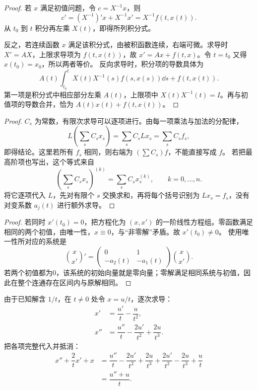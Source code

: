 \begin{proof}
若 $x$ 满足初值问题，令 $c=X^{-1}x$，则
\[
 c'=(X^{-1})'x+X^{-1}x'=X^{-1}f(t,x(t)).
\]
从 $t_0$ 到 $t$ 积分再左乘 $X(t)$，即得所列积分式。

反之，若连续函数 $x$ 满足该积分式，由被积函数连续，右端可微。求导时 $X'=AX$，上限求导项为 $f(t,x(t))$，故 $x'=Ax+f(t,x)$。令 $t=t_0$ 又得 $x(t_0)=x_0$，所以两者等价。
反向求导时，积分项的导数具体为
\[
A(t)\int_{t_0}^tX(t)X^{-1}(s)f(s,x(s))\dd s+f(t,x(t)).
\]
第一项是积分式中相应部分左乘 $A(t)$，上限项中 $X(t)X^{-1}(t)=I$。再与初值项的导数合并，恰为 $A(t)x(t)+f(t,x(t))$。
\end{proof}
\begin{proof}
$C_s$ 为常数，有限次求导可以逐项进行。由每一项乘法与加法的分配律，
\[
 L\left(\sum_s C_sx_s\right)=\sum_s C_sLx_s=\sum_s C_sf_s,
\]
即得结论。这里若所有 $f_s$ 相同，则右端为 $(\sum C_s)f$，不能直接写成 $f$。
若把最高阶项也写出，这个等式来自
\[
\left(\sum_sC_sx_s\right)^{(k)}=\sum_sC_sx_s^{(k)},\qquad k=0,\ldots,n.
\]
将它逐项代入 $L$，先对有限个 $s$ 交换求和，再将每个括号识别为 $Lx_s=f_s$，没有对变系数 $a_j(t)$ 进行额外求导。
\end{proof}
\begin{proof}
若同时 $x'(t_0)=0$，把方程化为 $(x,x')$ 的一阶线性方程组。零函数满足相同的两个初值，由唯一性，$x\equiv0$，与“非零解”矛盾。故 $x'(t_0)\ne0$。
使用唯一性所对应的系统是
\[
\binom{x}{x'}'=\begin{pmatrix}0&1\\-a_2(t)&-a_1(t)\end{pmatrix}\binom{x}{x'}.
\]
若两个初值都为0，该系统的初始向量就是零向量；零解满足相同系统与初值，因此在整个连通存在区间内与原解相同。
\end{proof}
由于已知解含 $1/t$，在 $t\ne0$ 处令 $x=u/t$，逐次求导：
\[
\begin{aligned}
x'&=\dfrac{u'}t-\dfrac u{t^2},\\
x''&=\dfrac{u''}t-\dfrac{2u'}{t^2}+\dfrac{2u}{t^3}.
\end{aligned}
\]
把各项完整代入并抵消：
\[
\begin{aligned}
x''+\dfrac2t x'+x
&=\dfrac{u''}t-\dfrac{2u'}{t^2}+\dfrac{2u}{t^3}
+\dfrac{2u'}{t^2}-\dfrac{2u}{t^3}+\dfrac ut\\
&=\dfrac{u''+u}{t}.
\end{aligned}
\]
